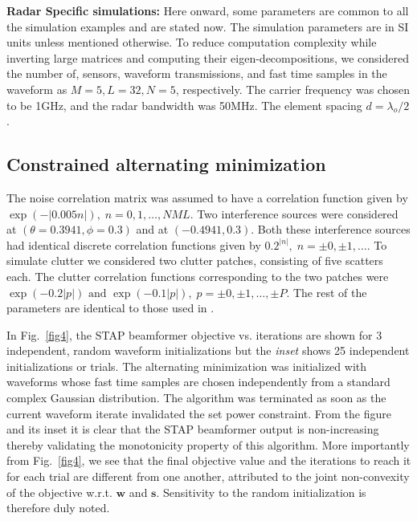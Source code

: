 \documentclass[11pt,draftclsnofoot,onecolumn]{IEEEtran}
\theoremstyle{definition}
\theoremstyle{remark}
\begin{document}
{\bf Radar Specific simulations:} Here onward, some  parameters are common to all the simulation examples and are stated now. The simulation parameters are in SI units  unless mentioned otherwise. To reduce computation complexity while inverting large matrices and computing their eigen-decompositions, we considered the number of, sensors, waveform transmissions, and fast time samples in the waveform as $M=5,L=32, N=5$, respectively. The carrier frequency was chosen to be 1GHz, and the radar bandwidth was 50MHz. The element spacing $d=\lambda_o/2$. 
\subsection{Constrained alternating minimization}
The noise correlation matrix was assumed to have a correlation function given by $\exp(-|0.005n|),\; n=0,1,\ldots,NML$. Two interference sources were considered at $(\theta=0.3941,\phi=0.3)$ and at $(-0.4941,0.3)$. Both these interference sources had identical  discrete correlation functions given by $0.2^{|n|},\; n=\pm 0, \pm 1,\ldots$. To simulate clutter we considered two clutter patches, consisting of five scatters each. The clutter correlation functions corresponding to the two patches were $\exp(-0.2|p|) \mbox{ and } \exp(-0.1|p|), \;p=\pm 0,\pm 1,\ldots,\pm P$. The rest of the parameters are identical to those used in \cite{Setlurradar2013}. 

In Fig.~\ref{fig4}, the STAP beamformer objective vs. iterations are shown for 3 independent, random waveform initializations but the {\it inset} shows 25 independent initializations or trials. The alternating minimization was initialized with waveforms whose fast time samples are chosen independently from a standard complex Gaussian distribution. The algorithm was terminated as soon as the current waveform iterate invalidated the set power constraint. From the figure and its inset it is clear that the STAP beamformer output is non-increasing thereby validating the monotonicity property of this algorithm.  More importantly from Fig.~\ref{fig4}, we see that the final objective value and the iterations to reach it for each trial are different from one another, attributed to the joint non-convexity of the objective w.r.t. $\mathbf{w}$ and $\mathbf{s}$. Sensitivity to the random initialization is therefore duly noted.
\end{document}

